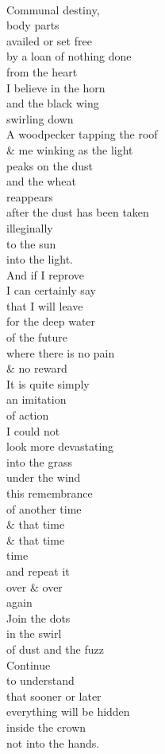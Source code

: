 \documentclass[smalldemyvopaper,11pt,twoside,onecolumn,openright,extrafontsizes]{memoir}
\begin{document}
\\Communal destiny,
\\body parts
\\availed or set free
\\by a loan of nothing done
\\from the heart
\\I believe in the horn
\\and the black wing
\\swirling down
\\A woodpecker tapping the roof
\\\& me winking as the light
\\peaks on the dust
\\and the wheat
\\reappears
\\after the dust has been taken
\\illeginally
\\to the sun
\\into the light.
\\And if I reprove
\\I can certainly say
\\that I will leave
\\for the deep water
\\of the future
\\where there is no pain
\\\& no reward
\\It is quite simply
\\an imitation
\\of action
\\I could not
\\look more devastating
\\into the grass
\\under the wind
\\this remembrance
\\of another time
\\\& that time
\\\& that time
\\time
\\and repeat it
\\over \& over
\\again
\\Join the dots
\\in the swirl
\\of dust and the fuzz
\\Continue
\\to understand
\\that sooner or later
\\everything will be hidden
\\inside the crown
\\not into the hands.
\end{document}
